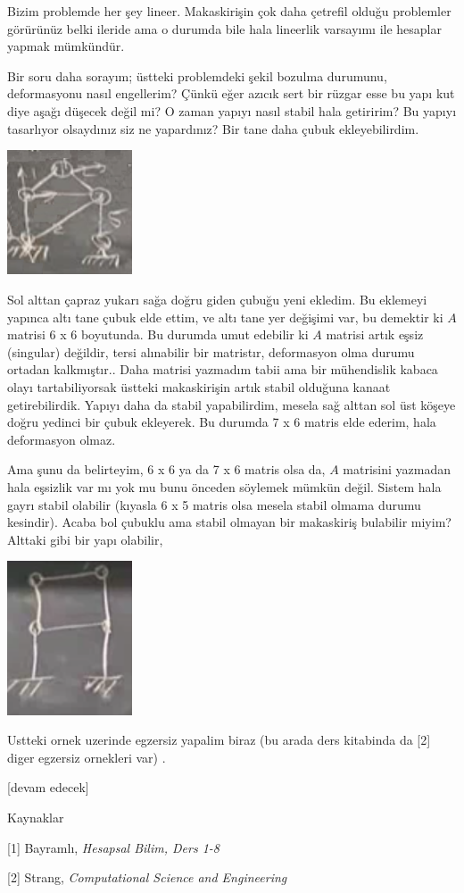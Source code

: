 \documentclass[12pt,fleqn]{article}\usepackage{../../common}
\begin{document}
Bizim problemde her şey lineer. Makaskirişin çok daha çetrefil olduğu problemler
görürünüz belki ileride ama o durumda bile hala lineerlik varsayımı ile hesaplar
yapmak mümkündür.

Bir soru daha sorayım; üstteki problemdeki şekil bozulma durumunu, deformasyonu
nasıl engellerim? Çünkü eğer azıcık sert bir rüzgar esse bu yapı kut diye aşağı
düşecek değil mi? O zaman yapıyı nasıl stabil hala getiririm? Bu yapıyı
tasarlıyor olsaydınız siz ne yapardınız? Bir tane daha çubuk ekleyebilirdim. 

\includegraphics[width=10em]{compscieng_1_15_05.png}

Sol alttan çapraz yukarı sağa doğru giden çubuğu yeni ekledim. Bu eklemeyi
yapınca altı tane çubuk elde ettim, ve altı tane yer değişimi var, bu demektir
ki $A$ matrisi 6 x 6 boyutunda. Bu durumda umut edebilir ki $A$ matrisi artık
eşsiz (singular) değildir, tersi alınabilir bir matristır, deformasyon olma
durumu ortadan kalkmıştır.. Daha matrisi yazmadım tabii ama bir mühendislik
kabaca olayı tartabiliyorsak üstteki makaskirişin artık stabil olduğuna kanaat
getirebilirdik. Yapıyı daha da stabil yapabilirdim, mesela sağ alttan sol üst
köşeye doğru yedinci bir çubuk ekleyerek. Bu durumda 7 x 6 matris elde ederim,
hala deformasyon olmaz.

Ama şunu da belirteyim, 6 x 6 ya da 7 x 6 matris olsa da, $A$ matrisini yazmadan
hala eşsizlik var mı yok mu bunu önceden söylemek mümkün değil. Sistem hala
gayrı stabil olabilir (kıyasla 6 x 5 matris olsa mesela stabil olmama durumu
kesindir). Acaba bol çubuklu ama stabil olmayan bir makaskiriş bulabilir miyim?
Alttaki gibi bir yapı olabilir,

\includegraphics[width=10em]{compscieng_1_15_06.png}

Ustteki ornek uzerinde egzersiz yapalim biraz (bu arada ders kitabinda da [2]
diger egzersiz ornekleri var) .












[devam edecek]

Kaynaklar

[1] Bayramlı, {\em Hesapsal Bilim, Ders 1-8}

[2] Strang, {\em Computational Science and Engineering}
\end{document}
